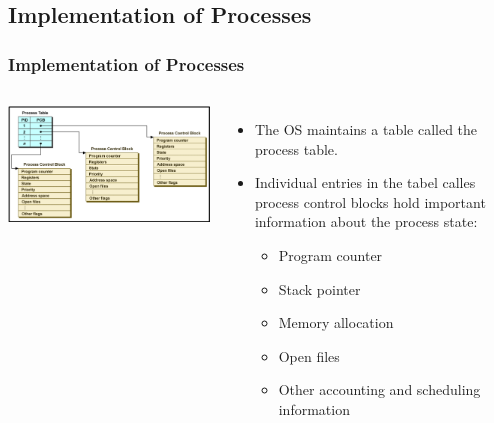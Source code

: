 \documentclass{beamer}
\begin{document}
\subsection{Implementation of Processes}
\begin{frame}
\frametitle{Implementation of Processes}
\begin{columns}[c]
\includegraphics[scale=0.35]{ptable.png}
\begin{itemize}
\item The OS maintains a table called the {\color{red}process table}.
\item Individual entries in the tabel calles {\color{green}process control blocks} hold important information about the process state:
\begin{itemize}
\item Program counter
\item Stack pointer
\item Memory allocation
\item Open files
\item Other accounting and scheduling information
\end{itemize}
\end{itemize}
\end{columns}
\end{frame}
\end{document}

